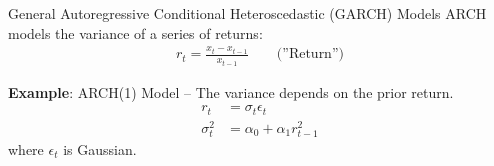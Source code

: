 \documentclass[ignorenonframetext,xcolor=x11names]{beamer}
\begin{document}







\begin{frame}{General Autoregressive Conditional Heteroscedastic (GARCH) Models}
ARCH models the variance of a series of returns:
\begin{align*}
r_t = \frac{x_t - x_{t-1}}{x_{t-1}} \qquad \text{(''Return'')}
\end{align*}

\textbf{Example}: ARCH(1) Model -- The variance depends on the prior return.
\begin{align*}
r_t &= \sigma_t \epsilon_t \\
\sigma_t^2 &= \alpha_0 + \alpha_1 r_{t-1}^2
\end{align*}
where $\epsilon_t$ is Gaussian. 
\end{frame}
\end{document}
